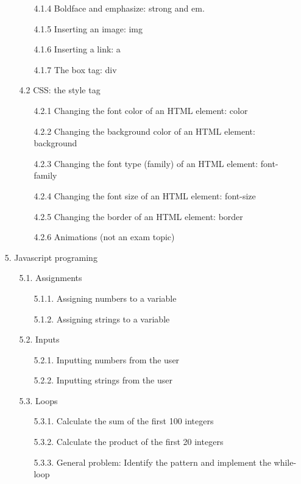 \documentclass{article}
\begin{document}
\begin{enumerate}
\begin{enumerate}
\begin{enumerate}
		\item[4.1.4] Boldface and emphasize: strong and em.
		\item[4.1.5] Inserting an image: img
		\item[4.1.6] Inserting a link: a
		\item[4.1.7] The box tag: div
		\end{enumerate}
	\item[4.2] CSS: the style tag
		\begin{enumerate}
		\item[4.2.1] Changing the font color of an HTML element: \mbox{color}
		\item[4.2.2] Changing the background color of an HTML element: \mbox{background}
		\item[4.2.3] Changing the font type (family) of an HTML element: \mbox{font-family}
		\item[4.2.4] Changing the font size of an HTML element: \mbox{font-size}
		\item[4.2.5] Changing the border of an HTML element: \mbox{border}
		\item[4.2.6] Animations (not an exam topic)
		\end{enumerate}
	\end{enumerate}
\item[ 5.] Javascript programing
	\begin{enumerate}
	\item[ 5.1.] Assignments
		\begin{enumerate}
             	\item[ 5.1.1.] Assigning numbers to a variable
		\item[ 5.1.2.] Assigning strings to a variable
		\end{enumerate}
	\item[ 5.2.] Inputs
		\begin{enumerate}
            	\item[ 5.2.1.] Inputting numbers from the user
            	\item[ 5.2.2.] Inputting strings from the user
		\end{enumerate}
	\item[ 5.3.] Loops
		\begin{enumerate}
            	\item[ 5.3.1.] Calculate the sum of the first 100 integers
            	\item[ 5.3.2.] Calculate the product of the first 20 integers
            	\item[ 5.3.3.] General problem: Identify the pattern and implement the while-loop

\end{enumerate}
\end{enumerate}
\end{enumerate}
\end{document}
